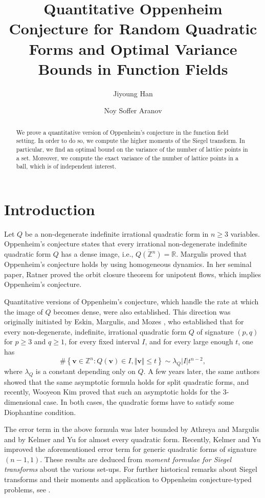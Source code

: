 \documentclass[11pt,a4paper,reqno]{amsart}
\title{Quantitative Oppenheim Conjecture for Random Quadratic Forms and Optimal Variance Bounds in Function Fields}
\author{Jiyoung Han}
\author{Noy Soffer Aranov}
\theoremstyle{definition}
\theoremstyle{remark}
\numberwithin{equation}{section}
\begin{document}
\begin{abstract}
    We prove a quantitative version of Oppenheim's conjecture in the function field setting. In order to do so, we compute the higher moments of the Siegel transform. In particular, we find an optimal bound on the variance of the number of lattice points in a set. Moreover, we compute the exact variance of the number of lattice points in a ball, which is of independent interest. 
\end{abstract}
\maketitle
\section{Introduction}
Let $Q$ be a non-degenerate indefinite irrational quadratic form in $n\geq 3$ variables. Oppenheim's conjecture \cite{Opp} states that every irrational non-degenerate indefinite quadratic form $Q$ has a dense image, i.e., $\overline{Q(\mathbb{Z}^n)}=\mathbb{R}$. Margulis \cite{Mar} proved that Oppenheim's conjecture holds by using homogeneous dynamics. In her seminal paper, Ratner \cite{Rat} proved the orbit closure theorem for unipotent flows, which implies Oppenheim's conjecture. 

Quantitative versions of Oppenheim's conjecture, which handle the rate at which the image of $Q$ becomes dense, were also established. 
This direction was originally initiated by Eskin, Margulis, and Mozes \cite{EMM}, who established that for every non-degenerate, indefinite, irrational quadratic form $Q$ of signature $(p,q)$ for $p\geq 3$ and $q\geq 1$, for every fixed interval $I$, and for every large enough $t$, one has 
$$\#\left\{\mathbf{v}\in \mathbb{Z}^n:Q(\mathbf{v})\in I,\Vert \mathbf{v}\Vert\leq t\right\}\sim \lambda_Q\vert I\vert t^{n-2},$$
where $\lambda_Q$ is a constant depending only on $Q$. A few years later, the same authors \cite{EMM05} showed that the same asymptotic formula holds for split quadratic forms, and recently, Wooyeon Kim \cite{Kim} proved that such an asymptotic holds for the 3-dimensional case. In both cases, the quadratic forms have to satisfy some Diophantine condition.

The error term in the above formula was later bounded by Athreya and Margulis \cite{AM} and by Kelmer and Yu \cite{KY} for almost every quadratic form. 
Recently, Kelmer and Yu \cite{KY23} improved the aforementioned error term for generic quadratic forms of signature $(n-1,1)$. These results are deduced from \emph{moment formulae for Siegel transforms} about the various set-ups. For further historical remarks about Siegel transforms and their moments and application to Oppenheim conjecture-typed problems, see \cite{KY23}.
\end{document}
